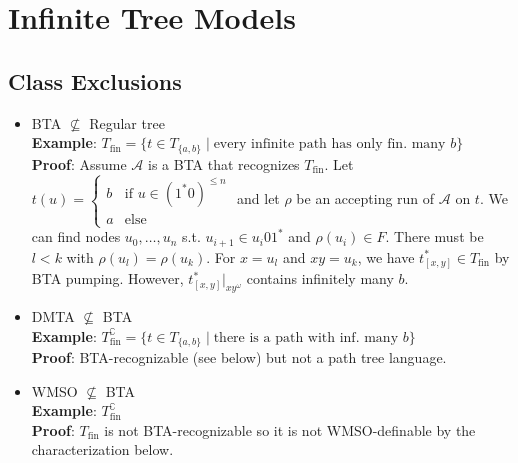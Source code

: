 \documentclass{article}
\begin{document}
\section{Infinite Tree Models}

\subsection{Class Exclusions}
\begin{itemize}
	\item BTA $\not\subseteq$ Regular tree \\
		\textbf{Example}: $T_\text{fin} = \{ t \in T_{\{a,b\}} \mid \text{every infinite path has only fin. many } b \}$ \\
		\textbf{Proof}: Assume $\mathcal{A}$ is a BTA that recognizes $T_\text{fin}$. Let $t(u) = \begin{cases} b & \text{if } u \in (1^*0)^{\leq n} \\ a & \text{else} \end{cases}$ and let $\rho$ be an accepting run of $\mathcal{A}$ on $t$. We can find nodes $u_0, \dots, u_n$ s.t. $u_{i+1} \in u_i 0 1^*$ and $\rho(u_i) \in F$. There must be $l < k$ with $\rho(u_l) = \rho(u_k)$. For $x = u_l$ and $xy = u_k$, we have $t^*_{[x,y]} \in T_\text{fin}$ by BTA pumping. However, $t^*_{[x,y]}|_{xy^\omega}$ contains infinitely many $b$.
	\item DMTA $\not\subseteq$ BTA \\
		\textbf{Example}: $T_\text{fin}^\complement = \{ t \in T_{\{a,b\}} \mid \text{there is a path with inf. many } b \}$ \\
		\textbf{Proof}: BTA-recognizable (see below) but not a path tree language.
	\item WMSO $\not\subseteq$ BTA \\
		\textbf{Example}: $T_\text{fin}^\complement$ \\
		\textbf{Proof}: $T_\text{fin}$ is not BTA-recognizable so it is not WMSO-definable by the characterization below.
\end{itemize}
\end{document}
